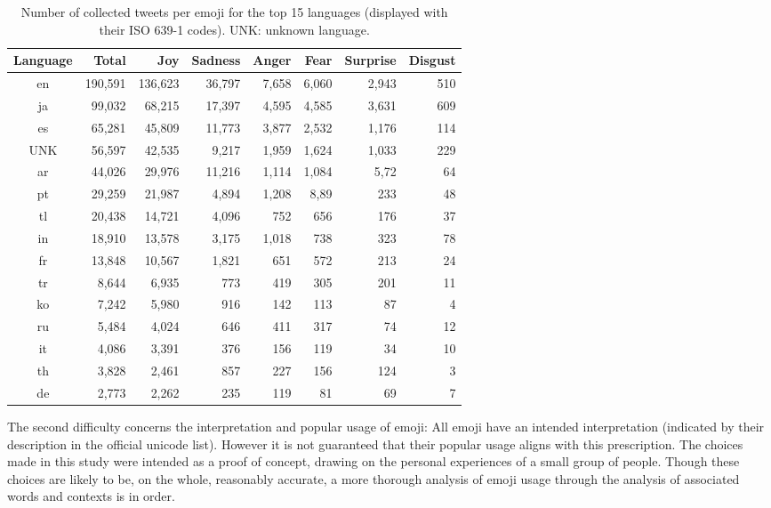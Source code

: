 \documentclass[10pt, a4paper]{article}
\begin{document}
\begin{table*}[!ht]
\centering
	\begin{tabular}{c | r | r | r | r | r | r | r}
\textbf{Language} & \textbf{Total} & \textbf{Joy} & \textbf{Sadness} & \textbf{Anger} & \textbf{Fear} & \textbf{Surprise} & \textbf{Disgust}  \\\hline
en  & 190,591 & 136,623 & 36,797 & 7,658 & 6,060 & 2,943 & 510 \\
ja  & 99,032 & 68,215 & 17,397 & 4,595 & 4,585 & 3,631 & 609 \\
es  & 65,281 & 45,809 & 11,773 & 3,877 & 2,532 & 1,176 & 114 \\
UNK  & 56,597 & 42,535 & 9,217 & 1,959 & 1,624 & 1,033 & 229\\
ar  & 44,026 & 29,976 & 11,216 & 1,114 & 1,084 & 5,72 & 64 \\
pt  & 29,259 & 21,987 & 4,894 & 1,208 & 8,89 & 233 & 48 \\
tl  & 20,438 & 14,721 & 4,096 & 752 & 656 & 176 & 37 \\
in  & 18,910 & 13,578 & 3,175 & 1,018 & 738 & 323 & 78 \\
fr  & 13,848 & 10,567 & 1,821 & 651 & 572 & 213 & 24\\
tr  & 8,644 & 6,935 & 773 & 419 & 305 & 201 & 11\\
ko  & 7,242 & 5,980 & 916 & 142 & 113 & 87 & 4\\
ru  & 5,484 & 4,024 & 646 & 411 & 317 & 74 & 12\\
it  & 4,086 & 3,391 & 376 & 156 & 119 & 34 & 10 \\
th  & 3,828 & 2,461 & 857 & 227 & 156 & 124 & 3\\
de  & 2,773 & 2,262 & 235 & 119 & 81 & 69 & 7
\end{tabular}
	\caption{Number of collected tweets per emoji for the top 15 languages (displayed with their ISO 639-1 codes). UNK: unknown language.}
	\label{tab:top-ten-langs}
\end{table*}

The second difficulty concerns the interpretation and popular usage of emoji: All emoji have an intended interpretation (indicated by their description in the official unicode list). However it is not guaranteed that their popular usage aligns with this prescription.
The choices made in this study were intended as a proof of concept, drawing on the personal experiences of a small group of people. 
Though these choices are likely to be, on the whole, reasonably accurate, a more thorough analysis of 
emoji usage through the analysis of associated words and contexts is in order. 
\end{document}
